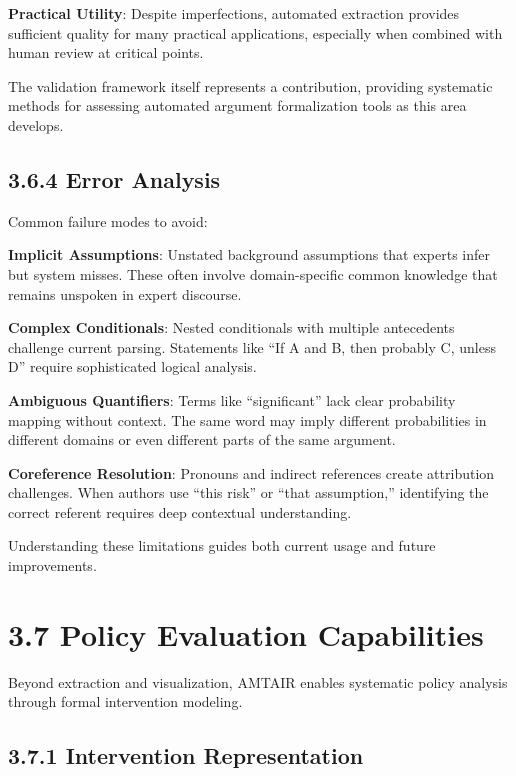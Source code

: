 \documentclass[
  11pt,
  letterpaper,
]{book}
\begin{document}
\textbf{Practical Utility}: Despite imperfections, automated extraction
provides sufficient quality for many practical applications, especially
when combined with human review at critical points.

The validation framework itself represents a contribution, providing
systematic methods for assessing automated argument formalization tools
as this area develops.

\subsection{3.6.4 Error Analysis}\label{sec-error-analysis}

Common failure modes to avoid:

\textbf{Implicit Assumptions}: Unstated background assumptions that
experts infer but system misses. These often involve domain-specific
common knowledge that remains unspoken in expert discourse.

\textbf{Complex Conditionals}: Nested conditionals with multiple
antecedents challenge current parsing. Statements like ``If A and B,
then probably C, unless D'' require sophisticated logical analysis.

\textbf{Ambiguous Quantifiers}: Terms like ``significant'' lack clear
probability mapping without context. The same word may imply different
probabilities in different domains or even different parts of the same
argument.

\textbf{Coreference Resolution}: Pronouns and indirect references create
attribution challenges. When authors use ``this risk'' or ``that
assumption,'' identifying the correct referent requires deep contextual
understanding.

Understanding these limitations guides both current usage and future
improvements.

\section{3.7 Policy Evaluation
Capabilities}\label{sec-policy-evaluation}

Beyond extraction and visualization, AMTAIR enables systematic policy
analysis through formal intervention modeling.

\subsection{3.7.1 Intervention
Representation}\label{sec-intervention-representation}
\end{document}
